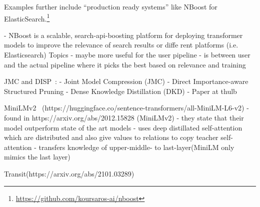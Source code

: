 Examples further include ``production ready systems'' like NBoost for ElasticSearch.\footnote{\url{https://github.com/koursaros-ai/nboost}}


- NBoost is a scalable, search-api-boosting platform for deploying
transformer models to improve the relevance of search results or
diffe rent platforms (i.e. Elasticsearch) Topics
- maybe more useful for the user pipeline
- is between user and the actual pipeline where it picks the best
based on relevance and training

JMC and DISP~\cite{cui21}:
- Joint Model Compression (JMC)
- Direct Importance-aware Structured Pruning
- Dense Knowledge Distillation (DKD)
- Paper at thulb

MiniLMv2~\cite{wang21} (https://huggingface.co/sentence-transformers/all-MiniLM-L6-v2)
- found in https://arxiv.org/abs/2012.15828 (MiniLMv2)
- they state that their model outperform state of the art models
- uses deep distillated self-attention which are distributed and also
give values to relations to copy teacher self-attention
- transfers knowledge of upper-middle- to last-layer(MiniLM only
mimics the last layer)

Transit(https://arxiv.org/abs/2101.03289)
